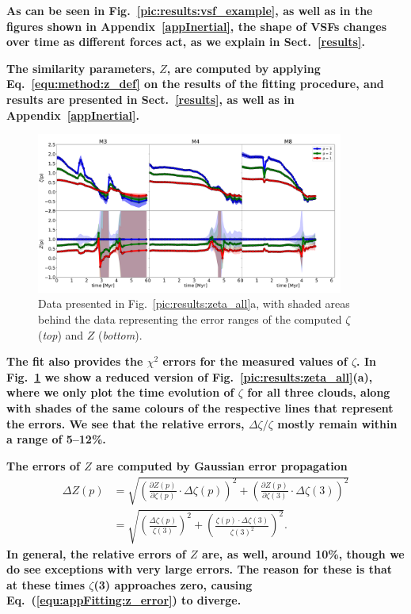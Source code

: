 \textbf{
As can be seen in Fig.~\ref{pic:results:vsf_example}, as well as in the figures shown in Appendix~\ref{appInertial}, the shape of VSFs changes over time as different forces act, as we explain in Sect.~\ref{results}. 
}

\textbf{
    The similarity parameters, $Z$, are computed by applying Eq.~\ref{equ:method:z_def} on the results of the fitting procedure, and results are presented in Sect.~\ref{results}, as well as in Appendix~\ref{appInertial}.
}

\begin{figure}
    \centering
    \includegraphics[width=0.9\textwidth]{error_vsf04_zeta_z.pdf}
    \caption{
        Data presented in Fig.~\ref{pic:results:zeta_all}a, with
        shaded areas behind the data representing the error ranges of the computed $\zeta$ (\textit{top}) and $Z$ (\textit{bottom}).
    }
    \label{pic:appFitting:error_vsfhr04_zeta_z}
\end{figure}


\textbf{
The fit also provides the $\chi^2$ errors for the measured values of $\zeta$. 
In Fig.~\ref{pic:appFitting:error_vsfhr04_zeta_z} we show a reduced version of Fig.~\ref{pic:results:zeta_all}(a), where we only plot the time evolution of $\zeta$ for all three clouds, along with shades of the same colours of the respective lines that represent the errors.
We see that the relative errors, $\Delta \zeta / \zeta$ mostly remain within a range of 5--12\%. 
}

\textbf{
The errors of $Z$ are computed by Gaussian error propagation
}
\begin{align}\Delta Z(p) &= \sqrt{ \left( \frac{\partial Z(p)}{\partial \zeta(p)} \cdot \Delta\zeta(p) \right)^2 + \left( \frac{\partial Z(p)}{\partial \zeta(3)} \cdot \Delta\zeta(3) \right)^2 } \\
        &= \sqrt{ \left( \frac{\Delta\zeta(p)}{\zeta(3)} \right)^2 + \left( \frac{ \zeta(p) \cdot \Delta\zeta(3)}{\zeta(3)^2} \right)^2 }.
        \label{equ:appFitting:z_error}
\end{align}
\textbf{
\noindent In general, the relative errors of $Z$ are, as well, around 10\%, though we do see exceptions with very large errors. 
The reason for these is that at these times $\zeta$(3) approaches zero, causing Eq.~(\ref{equ:appFitting:z_error}) to diverge.
}



\endinput
